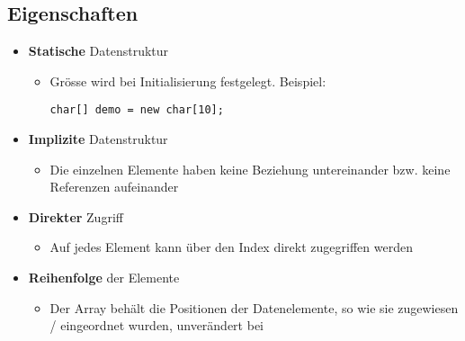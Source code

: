 \subsection{Eigenschaften}
\begin{itemize}
    \item \textbf{Statische} Datenstruktur
    \begin{itemize}
        \item Grösse wird bei Initialisierung festgelegt. Beispiel:
        \begin{lstlisting}
char[] demo = new char[10];
        \end{lstlisting}
    \end{itemize}
    \item \textbf{Implizite} Datenstruktur
    \begin{itemize}
        \item Die einzelnen Elemente haben keine Beziehung untereinander bzw. keine Referenzen aufeinander
    \end{itemize}
    \item \textbf{Direkter} Zugriff
    \begin{itemize}
        \item Auf jedes Element kann über den Index direkt zugegriffen werden
    \end{itemize}
    \item \textbf{Reihenfolge} der Elemente
    \begin{itemize}
        \item Der Array behält die Positionen der Datenelemente, so wie sie zugewiesen / eingeordnet wurden, unverändert bei
    \end{itemize}
\end{itemize}
